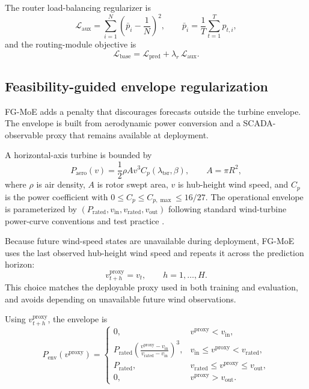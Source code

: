 ﻿\documentclass[review,1p,times]{elsarticle}
\begin{document}
The router load-balancing regularizer is
\begin{equation}
\mathcal{L}_{\text{aux}} = \sum_{i=1}^{N}\left(\bar{p}_i - \frac{1}{N}\right)^2,\qquad
\bar{p}_i=\frac{1}{T}\sum_{t=1}^{T}p_{t,i},
\label{eq:loss_aux}
\end{equation}
\noindent and the routing-module objective is
\begin{equation}
\mathcal{L}_{\text{base}} = \mathcal{L}_{\text{pred}} + \lambda_r\,\mathcal{L}_{\text{aux}}.
\label{eq:loss_base}
\end{equation}

\subsection{Feasibility-guided envelope regularization}
\label{sec:fg_moe}
FG-MoE adds a penalty that discourages forecasts outside the turbine envelope. The envelope is built from aerodynamic power conversion and a SCADA-observable proxy that remains available at deployment.

A horizontal-axis turbine is bounded by
\begin{equation}
P_{\mathrm{aero}}(v)=\frac{1}{2}\rho A v^3 C_p(\lambda_{\mathrm{tsr}},\beta),\qquad A=\pi R^2,
\label{eq:fg_aero}
\end{equation}
where $\rho$ is air density, $A$ is rotor swept area, $v$ is hub-height wind speed, and $C_p$ is the power coefficient with $0\le C_p\le C_{p,\max}\le 16/27$. The operational envelope is parameterized by $(P_{\mathrm{rated}},v_{\mathrm{in}},v_{\mathrm{rated}},v_{\mathrm{out}})$ following standard wind-turbine power-curve conventions and test practice \citep{burton2011wind,iec61400_12_1_2017,martincalzada2025optimized}.

Because future wind-speed states are unavailable during deployment, FG-MoE uses the last observed hub-height wind speed and repeats it across the prediction horizon:
\begin{equation}
v_{t+h}^{\mathrm{proxy}}=v_t,\qquad h=1,\ldots,H.
\label{eq:fg_proxy_last}
\end{equation}
This choice matches the deployable proxy used in both training and evaluation, and avoids depending on unavailable future wind observations.

Using $v_{t+h}^{\mathrm{proxy}}$, the envelope is
\begin{equation}
P_{\mathrm{env}}(v^{\mathrm{proxy}})=
\begin{cases}
0, & v^{\mathrm{proxy}}<v_{\mathrm{in}},\\[2pt]
P_{\mathrm{rated}}\left(\frac{v^{\mathrm{proxy}}-v_{\mathrm{in}}}{v_{\mathrm{rated}}-v_{\mathrm{in}}}\right)^3, & v_{\mathrm{in}}\le v^{\mathrm{proxy}}<v_{\mathrm{rated}},\\[6pt]
P_{\mathrm{rated}}, & v_{\mathrm{rated}}\le v^{\mathrm{proxy}}\le v_{\mathrm{out}},\\[2pt]
0, & v^{\mathrm{proxy}}>v_{\mathrm{out}}.
\end{cases}
\label{eq:fg_env}
\end{equation}
\end{document}
